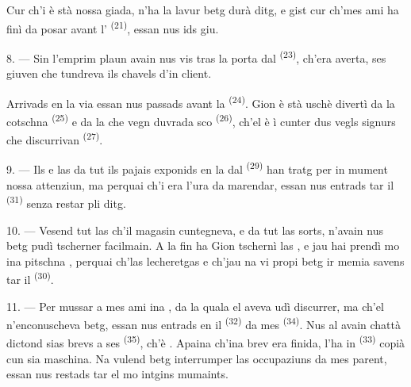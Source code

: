 Cur ch'i è stà nossa giada, n'ha la lavur betg durà ditg, e gist cur ch'mes ami ha
finì da posar avant l' \textsuperscript{(21)}, essan nus ids giu.

8. --- Sin l'emprim plaun avain nus vis tras la porta dal 
\textsuperscript{(23)}, ch'era averta, ses giuven che tundreva ils chavels d'in client.

Arrivads en la via essan nus passads avant la 
\textsuperscript{(24)}. Gion è stà uschè divertì da la cotschna 
\textsuperscript{(25)} e da la  che vegn duvrada sco 
\textsuperscript{(26)}, ch'el è ì cunter dus vegls signurs che discurrivan
 \textsuperscript{(27)}.

\VUsaut{3.0mm}

9. --- Ils  e las  da tut ils pajais exponids
en la  dal  \textsuperscript{(29)} han tratg per in mument
nossa attenziun, ma perquai ch'i era l'ura da marendar, essan nus entrads tar il
 \textsuperscript{(31)} senza restar pli ditg.

10. --- Vesend tut las  ch'il magasin cuntegneva,  e  da tut las sorts, n'avain nus betg pudì
tscherner facilmain. A la fin ha Gion tschernì las , e jau hai
prendì mo ina pitschna , perquai ch'las lecheretgas
 e ch'jau na vi propi betg ir memia savens tar il
 \textsuperscript{(30)}.

\VUsaut{3.0mm}

11. --- Per mussar a mes ami ina , da la quala el aveva udì
discurrer, ma ch'el n'enconuscheva betg, essan nus entrads en il 
\textsuperscript{(32)} da mes  \textsuperscript{(34)}. Nus al avain chattà
dictond sias brevs a ses  \textsuperscript{(35)}, ch'è .
Apaina ch'ina brev era finida, l'ha in  \textsuperscript{(33)} copià cun sia
maschina. Na vulend betg interrumper las occupaziuns da mes parent, essan nus restads
tar el mo intgins mumaints.

